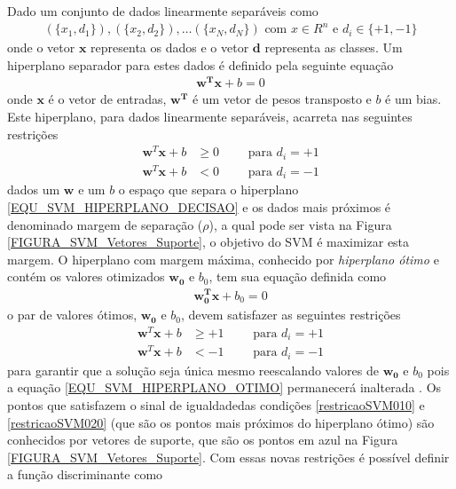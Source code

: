 \noindent
Dado um conjunto de dados linearmente separáveis como
\begin{align}
(\{x_{1}, d_{1}\}), (\{x_{2}, d_{2}\}), \ldots (\{x_{N}, d_{N}\}) \text{ com } x \in R^{n} \text{ e } d_{i} \in \{+1, -1\}
\end{align}
onde o vetor \(\mathbf{x}\) representa os dados e o vetor \(\mathbf{d}\) representa as classes. Um hiperplano separador para estes dados é definido pela seguinte equação
\begin{align}
\mathbf{w^{T}}\mathbf{x} + b = 0 		\label{EQU_SVM_HIPERPLANO_DECISAO}
\end{align}
onde \(\mathbf{x}\) é o vetor de entradas, \(\mathbf{w^{T}} \) é um vetor de pesos transposto e \(b\) é um bias. Este hiperplano, para dados linearmente separáveis, acarreta nas seguintes restrições
\begin{align}
\mathbf{w}^{T}\mathbf{x} + b &\geq 0  	\qquad \textrm{ para } d_{i} = +1 \label{restricaoSVM01} \\
\mathbf{w}^{T}\mathbf{x} + b &< 0		\qquad \textrm{ para } d_{i} = -1 \label{restricaoSVM02}
\end{align}
dados um \(\mathbf{w}\) e um \(b\) o espaço que separa o hiperplano \eqref{EQU_SVM_HIPERPLANO_DECISAO} e os dados mais próximos é denominado margem de separação (\(\rho\)), a qual pode ser vista na Figura \ref{FIGURA_SVM_Vetores_Suporte}, o objetivo do SVM é maximizar esta margem. O hiperplano com margem máxima, conhecido por \emph{hiperplano ótimo} e contém os valores otimizados \(\mathbf{w_{0}}\) e \(b_{0}\), tem sua equação definida como
\begin{align}
\mathbf{w^{T}_{0}}\mathbf{x} + b_{0} = 0 								\label{EQU_SVM_HIPERPLANO_OTIMO}
\end{align}
o par de valores ótimos, \(\mathbf{w_{0}}\) e \(b_{0}\), devem satisfazer as seguintes restrições
\begin{align}
\mathbf{w}^{T}\mathbf{x} + b &\geq +1  	\qquad \textrm{ para } d_{i} = +1 \label{restricaoSVM010} \\
\mathbf{w}^{T}\mathbf{x} + b &< -1		\qquad \textrm{ para } d_{i} = -1 \label{restricaoSVM020}
\end{align}
para garantir que a solução seja única mesmo reescalando valores de \(\mathbf{w_{0}}\) e \(b_{0}\) pois a equação \eqref{EQU_SVM_HIPERPLANO_OTIMO} permanecerá inalterada \cite{LIMA2004}. Os pontos que satisfazem o sinal de igualdadedas condições \eqref{restricaoSVM010} e \eqref{restricaoSVM020} (que são os pontos mais próximos do hiperplano ótimo) são conhecidos por vetores de suporte, que são os pontos em azul na Figura \ref{FIGURA_SVM_Vetores_Suporte}. Com essas novas restrições é possível definir a função discriminante como
